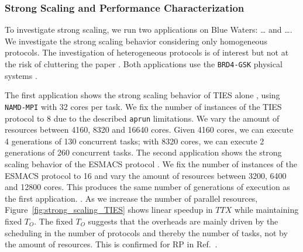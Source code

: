 

\subsubsection{Strong Scaling and Performance Characterization}


To investigate strong scaling, we run two applications on Blue Waters: \ldots
and \ldots {}. We investigate the
strong scaling behavior considering only homogeneous protocols. The
investigation of heterogeneous protocols is of interest but not at the risk
of cluttering the paper . Both applications use the \texttt{BRD4-GSK} physical
systems .

The first application  shows the strong scaling behavior of
TIES alone , using \texttt{NAMD-MPI} with 32
cores per task. We fix the number of instances of the TIES protocol to 8 due
to the described \texttt{aprun} limitations. We vary the amount of resources
between 4160, 8320 and 16640 cores. Given 4160 cores, we can execute 4
generations of 130 concurrent tasks; with 8320 cores, we can execute 2
generations of 260 concurrent tasks. The second application shows the strong
scaling behavior of the ESMACS protocol . We fix the number of instances of the ESMACS
protocol to 16 and vary the amount of resources between 3200, 6400 and 12800
cores. This produces the same number of generations of execution  as the first
application. . As we increase the number of parallel resources,
Figure~\ref{fig:strong_scaling_TIES} shows linear speedup in \(TTX\) while
maintaining fixed $T_{O}$. The fixed $T_{O}$ suggests that the overheads are
mainly driven by the scheduling in the number of protocols and thereby the
number of tasks, not by the amount of resources. This is confirmed for RP in
Ref.~\cite{merzky2018}.

